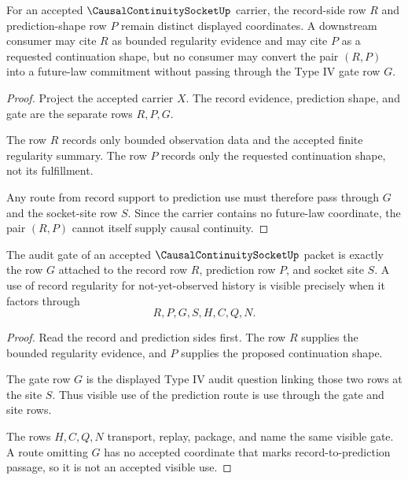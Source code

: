 \begin{theorem}
\label{thm:causal-continuity-socket-record-prediction-separation}
For an accepted $\CausalContinuitySocketUp$ carrier, the record-side row $R$ and prediction-shape row $P$ remain distinct displayed coordinates. A downstream consumer may cite $R$ as bounded regularity evidence and may cite $P$ as a requested continuation shape, but no consumer may convert the pair $(R,P)$ into a future-law commitment without passing through the Type IV gate row $G$.
\end{theorem}
\begin{proof}
Project the accepted carrier $X$. The record evidence, prediction shape, and gate are the separate rows $R,P,G$.

The row $R$ records only bounded observation data and the accepted finite regularity summary. The row $P$ records only the requested continuation shape, not its fulfillment.

Any route from record support to prediction use must therefore pass through $G$ and the socket-site row $S$. Since the carrier contains no future-law coordinate, the pair $(R,P)$ cannot itself supply causal continuity.
\end{proof}

\begin{theorem}
\label{thm:causal-continuity-socket-audit-gate}
The audit gate of an accepted $\CausalContinuitySocketUp$ packet is exactly the row $G$ attached to the record row $R$, prediction row $P$, and socket site $S$. A use of record regularity for not-yet-observed history is visible precisely when it factors through
$$
R,P,G,S,H,C,Q,N.
$$
\end{theorem}
\begin{proof}
Read the record and prediction sides first. The row $R$ supplies the bounded regularity evidence, and $P$ supplies the proposed continuation shape.

The gate row $G$ is the displayed Type IV audit question linking those two rows at the site $S$. Thus visible use of the prediction route is use through the gate and site rows.

The rows $H,C,Q,N$ transport, replay, package, and name the same visible gate. A route omitting $G$ has no accepted coordinate that marks record-to-prediction passage, so it is not an accepted visible use.
\end{proof}

